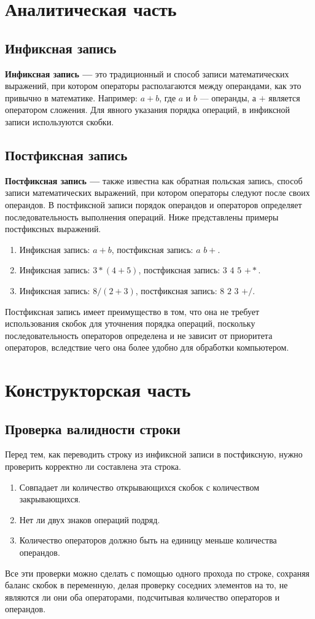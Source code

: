 \documentclass[12pt, a4paper]{article}
\begin{document}
\section{Аналитическая часть}
\subsection{Инфиксная запись}
\textbf{Инфиксная запись ---} это традиционный и способ записи 
математических выражений, при котором операторы располагаются между 
операндами, как это привычно в математике. Например: $a+b$, где $a$ и 
$b$ --- операнды, а $+$ является оператором сложения.
Для явного указания порядка операций, в инфиксной 
записи используются скобки.
\subsection{Постфиксная запись}
\textbf{Постфиксная запись ---} также известна как обратная польская 
запись, способ записи математических выражений, при котором операторы 
следуют после своих операндов. В постфиксной записи порядок операндов и 
операторов определяет последовательность выполнения операций. Ниже
представлены примеры постфиксных выражений.
	\begin{enumerate}
		\item Инфиксная запись: $a+b$, постфиксная запись: $a$ $b+$.
		\item Инфиксная запись: $3*(4+5)$, постфиксная запись: $3$ $4$ 
		$5$ $+*$.
		\item Инфиксная запись: $8/(2+3)$, постфиксная запись: $8$ $2$ 
		$3$ $+/$.
	\end{enumerate}

Постфиксная запись имеет преимущество в том, что она не требует 
использования скобок для уточнения порядка операций, поскольку 
последовательность операторов определена и не зависит от приоритета 
операторов, вследствие чего она более удобно для обработки компьютером.
\newpage
\section{Конструкторская часть}
\subsection{Проверка валидности строки}
Перед тем, как переводить строку из инфиксной записи в постфиксную, 
нужно проверить корректно ли составлена эта строка.
\begin{enumerate}
	\item Совпадает ли количество открывающихся скобок с количеством 
	закрывающихся.
	\item Нет ли двух знаков операций подряд.
	\item Количество операторов должно быть на единицу меньше 
	количества операндов.
\end{enumerate}
Все эти проверки можно сделать с помощью одного прохода по строке, 
сохраняя баланс скобок в переменную, делая проверку соседних элементов 
на то, не являются ли они оба операторами, подсчитывая количество
операторов и операндов.
\end{document}
